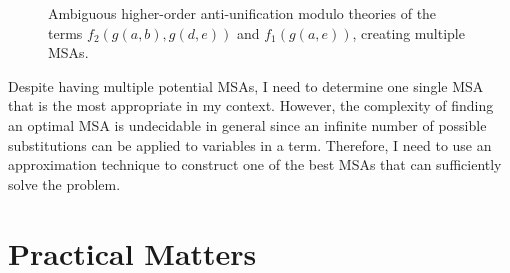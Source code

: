\begin{figure}[t]
\centering{}
\vspace*{1em}

\centering{}
\caption[Ambiguous higher-order anti-unification modulo theories of two terms.]{Ambiguous higher-order anti-unification modulo theories of the terms $f_2(g(a,b), g(d,e))$
and $f_1(g(a,e))$, creating multiple MSAs.}
  \label{fig:multipleMSA}
\end{figure}


Despite having multiple potential MSAs, I need to determine one single MSA that is the most appropriate in my context. However, the complexity of finding an optimal MSA is undecidable in general \cite{2008:fse:cottrell} since an infinite number of possible substitutions can be applied to variables in a term. Therefore, I need to use an approximation technique to construct one of the best MSAs that can sufficiently solve the problem.

\section{Practical Matters}

